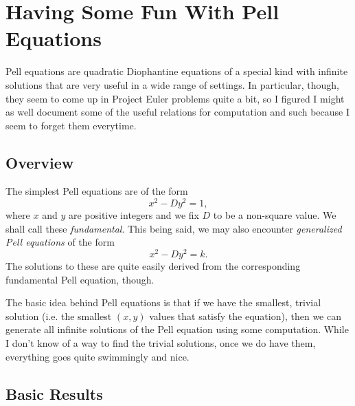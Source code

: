\documentclass[a5paper]{article}
\begin{document}
\section*{Having Some Fun With Pell Equations}

Pell equations are quadratic Diophantine equations of a special kind with
infinite solutions that are very useful in a wide range of settings. In
particular, though, they seem to come up in Project Euler problems quite a bit,
so I figured I might as well document some of the useful relations for
computation and such because I seem to forget them everytime.

\subsection*{Overview}

The simplest Pell equations are of the form
\[
    x^2 - Dy^2 = 1
,\]
where \( x \) and \( y \) are positive integers and we fix \( D \) to be a non-square value. We shall call
these \textit{fundamental}. This being said, we may also encounter \textit{generalized Pell equations} of the form
\[
    x^2 - Dy^2 = k
.\]
The solutions to these are quite easily derived from the corresponding
fundamental Pell equation, though.

The basic idea behind Pell equations is that if we have the smallest, trivial solution
(i.e. the smallest \( (x, y) \) values that satisfy the equation), then we can
generate all infinite solutions of the Pell equation using some computation.
While I don't know of a way to find the trivial solutions, once we do have
them, everything goes quite swimmingly and nice.

\subsection*{Basic Results}
\end{document}
